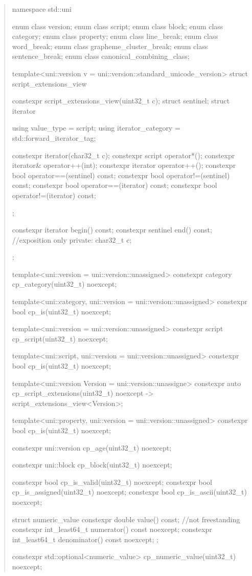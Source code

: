 \documentclass{wg21}
\begin{document}
\begin{quote}
\begin{codeblock}

namespace std::uni {

enum class version;
enum class script;
enum class block;
enum class category;
enum class property;
enum class line_break;
enum class word_break;
enum class grapheme_cluster_break;
enum class sentence_break;
enum class canonical_combining_class;


template<uni::version v = uni::version::standard_unicode_version>
struct script_extensions_view {
    constexpr script_extensions_view(uint32_t c);
    struct sentinel;
    struct iterator {
        using value_type = script;
        using iterator_category = std::forward_iterator_tag;

        constexpr iterator(char32_t c);
        constexpr script operator*();
        constexpr iterator& operator++(int);
        constexpr iterator operator++();
        constexpr bool operator==(sentinel) const;
        constexpr bool operator!=(sentinel) const;
        constexpr bool operator==(iterator) const;
        constexpr bool operator!=(iterator) const;
    };

    constexpr iterator begin() const;
    constexpr sentinel end() const;
    //exposition only
    private:
    char32_t c;
};


template<uni::version = uni::version::unassigned>
constexpr category cp_category(uint32_t) noexcept;

template<uni::category, uni::version = uni::version::unassigned>
constexpr bool cp_is(uint32_t) noexcept;

template<uni::version = uni::version::unassigned>
constexpr script cp_script(uint32_t) noexcept;

template<uni::script, uni::version = uni::version::unassigned>
constexpr bool cp_is(uint32_t) noexcept;

template<uni::version Version = uni::version::unassigne>
constexpr auto cp_script_extensions(uint32_t) noexcept
    -> script_extensions_view<Version>;

template<uni::property, uni::version = uni::version::unassigned>
constexpr bool cp_is(uint32_t) noexcept;

constexpr uni::version cp_age(uint32_t) noexcept;

constexpr uni::block cp_block(uint32_t) noexcept;

constexpr bool cp_is_valid(uint32_t) noexcept;
constexpr bool cp_is_assigned(uint32_t) noexcept;
constexpr bool cp_is_ascii(uint32_t) noexcept;

struct numeric_value {
    constexpr double value() const; //not freestanding
    constexpr int_least64_t numerator() const noexcept;
    constexpr int_least64_t denominator() const noexcept;
};

constexpr std::optional<numeric_value>
cp_numeric_value(uint32_t) noexcept;

}

\end{codeblock}
\end{quote}
\end{document}

